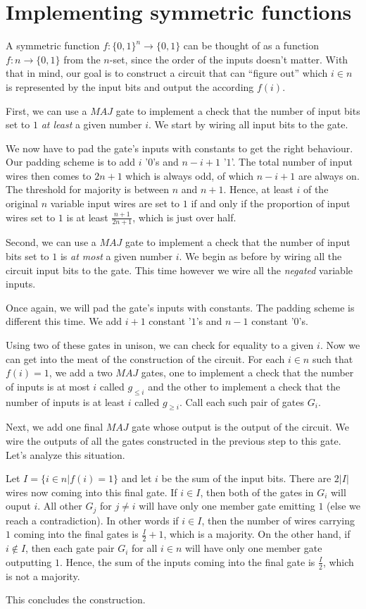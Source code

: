 \documentclass[11pt,letterpaper]{article}
\begin{document}
\section{Implementing symmetric functions}

A symmetric function $f : \{0, 1\}^n \to \{0, 1\}$ can be thought of as a
function $f : n \to \{0, 1\}$ from the $n$-set, since the order of the inputs
doesn't matter. With that in mind, our goal is to construct a circuit that can
``figure out'' which $i \in n$ is represented by the input bits and output the
according $f(i)$.

First, we can use a $MAJ$ gate to implement a check that the number of input
bits set to $1$ \emph{at least} a given number $i$. We start by wiring all
input bits to the gate.

We now have to pad the gate's inputs with constants to get the right behaviour.
Our padding scheme is to add $i$ '$0$'s and $n - i + 1$ '$1$'. The total number
of input wires then comes to $2n + 1$ which is always odd, of which $n - i + 1$
are always on. The threshold for majority is between $n$ and $n+1$. Hence, at
least $i$ of the original $n$ variable input wires are set to $1$ if and only
if the proportion of input wires set to $1$ is at least $\frac{n + 1}{2n + 1}$,
which is just over half.

Second, we can use a $MAJ$ gate to implement a check that the number of input
bits set to $1$ is \emph{at most} a given number $i$. We begin as before by
wiring all the circuit input bits to the gate. This time however we wire all
the \emph{negated} variable inputs.

Once again, we will pad the gate's inputs with constants. The padding scheme is
different this time. We add $i + 1$ constant '$1$'s and $n - 1$ constant
'$0$'s.

Using two of these gates in unison, we can check for equality to a given $i$.
Now we can get into the meat of the construction of the circuit. For each $i
\in n$ such that $f(i) = 1$, we add a two $MAJ$ gates, one to implement a check
that the number of inputs is at most $i$ called $g_{\leq i}$ and the other to
implement a check that the number of inputs is at least $i$ called
$g_{\geq i}$. Call each such pair of gates $G_i$.

Next, we add one final $MAJ$ gate whose output is the output of the circuit. We
wire the outputs of all the gates constructed in the previous step to this
gate. Let's analyze this situation.

Let $I = \{i \in n | f(i) = 1\}$ and let $i$ be the sum of the input bits.
There are $2|I|$ wires now coming into this final gate.
If $i \in I$, then both of the gates in $G_i$ will ouput $i$. All other $G_j$
for $j \neq i$ will have only one member gate emitting $1$ (else we reach a
contradiction). In other words if $i \in I$, then the number of wires carrying
$1$ coming into the final gates is $\frac{I}{2} + 1$, which is a majority.
On the other hand, if $i \notin I$, then each gate pair $G_i$ for all $i \in n$
will have only one member gate outputting $1$. Hence, the sum of the inputs
coming into the final gate is $\frac{I}{2}$, which is not a majority.

This concludes the construction.
\end{document}
